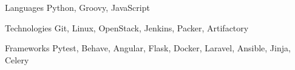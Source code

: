 
\begin{cvskills}
  \cvskill
    {Languages} %
    {Python, Groovy, JavaScript} %

  \cvskill
    {Technologies} %
    {Git, Linux, OpenStack, Jenkins, Packer, Artifactory} %

  \cvskill
    {Frameworks} %
    {
        Pytest,
        Behave,
        Angular,
        Flask,
        Docker,
        Laravel,
        Ansible,
        Jinja,
        Celery
    } %

\end{cvskills}
